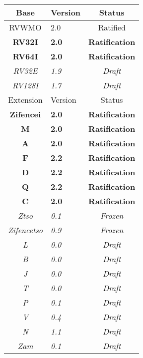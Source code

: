 {
\begin{table}[hbt]
  \centering
  \begin{tabular}{|c|l|c|}
    \hline
    Base           & Version & Status\\
    \hline
    RVWMO          & 2.0 & Ratified   \\
    \bf RV32I      & \bf 2.0 & \bf Ratification \\
    \bf RV64I      & \bf 2.0 & \bf Ratification \\
    \em RV32E      & \em 1.9 & \em Draft \\
    \em RV128I     & \em 1.7 & \em Draft \\
    \hline
    Extension      & Version & Status \\
    \hline
    \bf Zifencei   & \bf 2.0 & \bf Ratification \\
    \bf M          & \bf 2.0 & \bf Ratification \\
    \bf A          & \bf 2.0 & \bf Ratification \\
    \bf F          & \bf 2.2 & \bf Ratification \\
    \bf D          & \bf 2.2 & \bf Ratification \\
    \bf Q          & \bf 2.2 & \bf Ratification \\
    \bf C          & \bf 2.0 & \bf Ratification \\
    \em Ztso       & \em 0.1 & \em Frozen \\
    \em Zifencetso & \em 0.9 & \em Frozen \\
    \em L          & \em 0.0 & \em Draft \\
    \em B          & \em 0.0 & \em Draft \\
    \em J          & \em 0.0 & \em Draft \\
    \em T          & \em 0.0 & \em Draft \\
    \em P          & \em 0.1 & \em Draft \\
    \em V          & \em 0.4 & \em Draft \\
    \em N          & \em 1.1 & \em Draft \\
    \em Zam        & \em 0.1 & \em Draft \\
    \hline
  \end{tabular}
\end{table}
}

